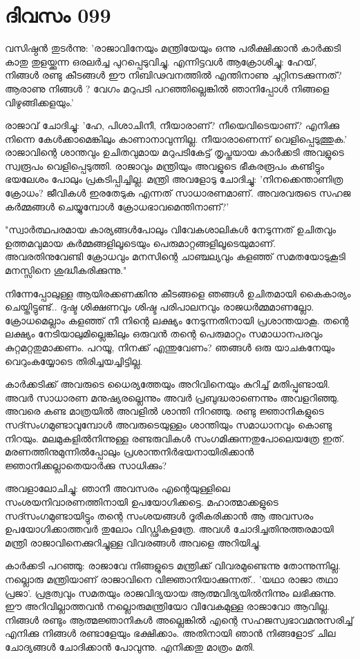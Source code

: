  
\section{ദിവസം 099}



വസിഷ്ഠന്‍ തുടര്‍ന്നു: 'രാജാവിനേയും മന്ത്രിയേയും ഒന്നു പരീക്ഷിക്കാന്‍ കാര്‍ക്കടി കാതു തുളയ്ക്കുന്ന ഒരലര്‍ച്ച പുറപ്പെടുവിച്ചു. എന്നിട്ടവള്‍ ആക്രോശിച്ചു: ഹേയ്‌, നിങ്ങള്‍ രണ്ടു കീടങ്ങള്‍ ഈ നിബിഢവനത്തില്‍ എന്തിനാണു ചുറ്റിനടക്കുന്നത്‌? ആരാണു നിങ്ങള്‍ ? വേഗം മറുപടി പറഞ്ഞില്ലെങ്കില്‍ ഞാനിപ്പോള്‍ നിങ്ങളെ വിഴുങ്ങിക്കളയും.'

രാജാവ്‌ ചോദിച്ചു: 'ഹേ, പിശാചിനീ, നീയാരാണ്‌? നീയെവിടെയാണ്‌? എനിക്കു നിന്നെ കേള്‍ക്കാമെങ്കിലും കാണാനാവുന്നില്ല. നീയാരാണെന്ന് വെളിപ്പെടുത്തുക.' രാജാവിന്റെ ശാന്തവും ഉചിതവുമായ മറുപടികേട്ട്‌ തൃപ്തയായ കാര്‍ക്കടി അവളുടെ സ്വരൂപം വെളിപ്പെടുത്തി. രാജാവും മന്ത്രിയും അവളുടെ ഭീകരരൂപം കണ്ടിട്ടും ഭയലേശം പോലും പ്രകടിപ്പിച്ചില്ല. മന്ത്രി അവളോടു ചോദിച്ചു: 'നിനക്കെന്താണിത്ര ക്രോധം? ജീവികള്‍ ഇരതേടുക എന്നത്‌ സാധാരണമാണ്‌. അവരവരുടെ സഹജ കര്‍മ്മങ്ങള്‍ ചെയ്യുമ്പോള്‍ ക്രോധഭാവമെന്തിനാണ്‌?'

"സ്വാര്‍ത്ഥപരമായ കാര്യങ്ങള്‍പോലും വിവേകശാലികള്‍ നേടുന്നത്‌ ഉചിതവും ഉത്തമവുമായ കര്‍മ്മങ്ങളിലൂടെയും പെരുമാറ്റങ്ങളിലൂടെയുമാണ്‌. അവരതിനുവേണ്ടി ക്രോധവും മനസിന്റെ ചാഞ്ചല്യവും കളഞ്ഞ്‌ സമതയോടുകൂടി മനസ്സിനെ ശുദ്ധീകരിക്കുന്നു." 

നിന്നേപ്പോലുള്ള ആയിരക്കണക്കിനു കീടങ്ങളെ ഞങ്ങള്‍ ഉചിതമായി കൈകാര്യം ചെയ്തിട്ടുണ്ട്‌.. ദുഷ്ട ശിക്ഷണവും ശിഷ്ട പരിപാലനവും രാജധര്‍മ്മമാണല്ലോ. ക്രോധമെല്ലാം കളഞ്ഞ്‌ നീ നിന്റെ ലക്ഷ്യം നേടുന്നതിനായി പ്രശാന്തയാകൂ. തന്റെ ലക്ഷ്യം നേടിയാലുമില്ലെങ്കിലും ഒരുവന്‍ തന്റെ പെരുമാറ്റം സമാധാനപരവും കുറ്റമറ്റതുമാക്കണം. പറയൂ, നിനക്ക്‌ എന്തുവേണം? ഞങ്ങള്‍ ഒരു യാചകനേയും വെറുംകയ്യോടെ തിരിച്ചയച്ചിട്ടില്ല.

കാര്‍ക്കടിക്ക്‌ അവരുടെ ധൈര്യത്തേയും അറിവിനെയും കുറിച്ച്‌ മതിപ്പുണ്ടായി. അവര്‍ സാധാരണ മനുഷ്യരല്ലെന്നും അവര്‍ പ്രബുദ്ധരാണെന്നും അവളറിഞ്ഞു. അവരെ കണ്ട മാത്രയില്‍ അവളില്‍ ശാന്തി നിറഞ്ഞു. രണ്ടു ജ്ഞാനികളുടെ സദ്സംഗമുണ്ടാവുമ്പോള്‍ അവരുടെയുള്ളം ശാന്തിയും സമാധാനവും കൊണ്ടു നിറയും. മലമുകളില്‍നിന്നുള്ള രണ്ടരുവികള്‍ സംഗമിക്കുന്നതുപോലെയത്രേ ഇത്‌. മരണത്തിനുമുന്നില്‍പ്പോലും പ്രശാന്തനിര്‍ഭയനായിരിക്കാന്‍ ജ്ഞാനിക്കല്ലാതെയാര്‍ക്കു സാധിക്കും?

അവളാലോചിച്ചു: ഞാനീ അവസരം എന്റെയുള്ളിലെ സംശയനിവാരണത്തിനായി ഉപയോഗിക്കട്ടെ. മഹാത്മാക്കളുടെ സദ്സംഗമുണ്ടായിട്ടും തന്റെ സംശയങ്ങള്‍ ദൂരീകരിക്കാന്‍ ആ അവസരം ഉപയോഗിക്കാത്തവര്‍ തുലോം വിഡ്ഢികളത്രേ. അവള്‍ ചോദിച്ചതിനുത്തരമായി മന്ത്രി രാജാവിനെക്കുറിച്ചുള്ള വിവരങ്ങള്‍ അവളെ അറിയിച്ചു. 

കാര്‍ക്കടി പറഞ്ഞു: രാജാവേ നിങ്ങളുടെ മന്ത്രിക്ക്‌ വിവരമുണ്ടെന്നു തോന്നുന്നില്ല. നല്ലൊരു മന്ത്രിയാണ്‌ രാജാവിനെ വിജ്ഞാനിയാക്കുന്നത്‌.. 'യഥാ രാജാ തഥാ പ്രജാ'. പ്രഭുത്വവും സമതയും രാജവിദ്യയായ ആത്മവിദ്യയില്‍നിന്നും ലഭിക്കുന്നു. ഈ അറിവില്ലാത്തവന്‍ നല്ലൊരുമന്ത്രിയോ വിവേകമുള്ള രാജാവോ ആവില്ല. നിങ്ങള്‍ രണ്ടും ആത്മജ്ഞാനികള്‍ അല്ലെങ്കില്‍ എന്റെ സഹജസ്വഭാവമനുസരിച്ച്‌ എനിക്കു നിങ്ങള്‍ രണ്ടാളേയും ഭക്ഷിക്കാം. അതിനായി ഞാന്‍ നിങ്ങളോട്‌ ചില ചോദ്യങ്ങള്‍ ചോദിക്കാന്‍ പോവുന്നു. എനിക്കതു മാത്രം മതി. 
